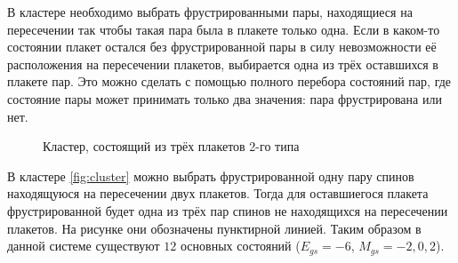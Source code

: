 \documentclass[utf8, babel, sor, jor, amsmath, amssymb, reprint]{elsarticle} %
\begin{document}
В кластере необходимо выбрать фрустрированными пары, находящиеся на пересечении так чтобы такая пара была в плакете только одна. Если в каком-то состоянии плакет остался без фрустрированной пары в силу невозможности её расположения на пересечении плакетов, выбирается одна из трёх оставшихся в плакете пар. Это можно сделать с помощью полного перебора состояний пар, где состояние пары может принимать только два значения: пара фрустрирована или нет.

\begin{figure}[H]
	\centering
	\begin{minipage}{0.3\textwidth}
		\centering
		\label{fig:cluster_gs1}
	\end{minipage}
	\hspace{20pt} 
	\begin{minipage}{0.3\textwidth}
		\centering
		\label{fig:cluster_gs2}
	\end{minipage}
	\caption{Кластер, состоящий из трёх плакетов 2-го типа}
	\label{fig:cluster}
\end{figure}

В кластере \eqref{fig:cluster} можно выбрать фрустрированной одну пару спинов находящуюся на пересечении двух плакетов. Тогда для оставшиегося плакета фрустрированной будет одна из трёх пар спинов не находящихся на пересечении плакетов. На рисунке они обозначены пунктирной линией. Таким образом в данной системе существуют $12$ основных состояний ($E_{gs}=-6$, $M_{gs}=-2, 0, 2$).
\end{document}
